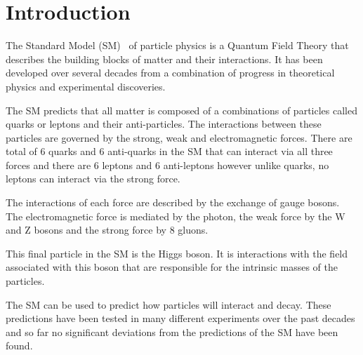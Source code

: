 \chapter{Introduction}
\label{sec:intro}


The Standard Model (SM)~\cite{GLASHOW1961579,PhysRevLett.19.1264,PhysRevD.2.1285} of particle physics is a Quantum Field Theory that describes the building blocks of matter and their interactions. It has been developed over several decades from a combination of progress in theoretical physics and experimental discoveries. 

The SM predicts that all matter is composed of a combinations of particles called quarks or leptons and their anti-particles. The interactions between these particles are governed by the strong, weak and electromagnetic forces. 
There are total of 6 quarks and 6 anti-quarks in the SM that can interact via all three forces and there are 6 leptons and 6 anti-leptons however unlike quarks, no leptons can interact via the strong force.

The interactions of each force are described by the exchange of gauge bosons. The electromagnetic force is mediated by the photon, the weak force by the W and Z bosons and the strong force by 8 gluons. 

This final particle in the SM is the Higgs boson. It is interactions with the field associated with this boson that are responsible for the intrinsic masses of the particles.  




The SM can be used to predict how particles will interact and decay. These predictions have been tested in many different experiments over the past decades and so far no significant deviations from the predictions of the SM have been found. 

